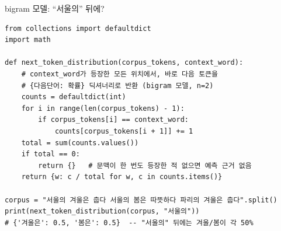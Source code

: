 \begin{frame}[fragile]{bigram 모델: ``서울의'' 뒤에?}
\begin{lstlisting}
from collections import defaultdict
import math

def next_token_distribution(corpus_tokens, context_word):
    # context_word가 등장한 모든 위치에서, 바로 다음 토큰을
    # {다음단어: 확률} 딕셔너리로 반환 (bigram 모델, n=2)
    counts = defaultdict(int)
    for i in range(len(corpus_tokens) - 1):
        if corpus_tokens[i] == context_word:
            counts[corpus_tokens[i + 1]] += 1
    total = sum(counts.values())
    if total == 0:
        return {}   # 문맥이 한 번도 등장한 적 없으면 예측 근거 없음
    return {w: c / total for w, c in counts.items()}

corpus = "서울의 겨울은 춥다 서울의 봄은 따뜻하다 파리의 겨울은 춥다".split()
print(next_token_distribution(corpus, "서울의"))
# {'겨울은': 0.5, '봄은': 0.5}  -- "서울의" 뒤에는 겨울/봄이 각 50%
\end{lstlisting}
  

\end{frame}
